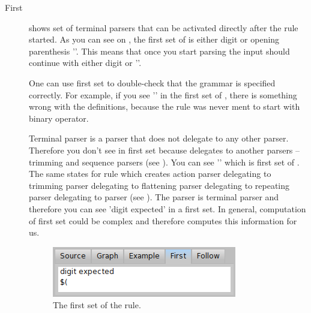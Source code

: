 \documentclass[a4paper,10pt,twoside]{book}
\begin{document}
\begin{description}
\item[First] shows set of terminal parsers that can be activated directly 
    after the rule started.
  As you can see on , the first set of  is 
    either digit or opening parenthesis '\ct{(}'. 
  This means that once you start parsing  the input should continue 
    with either digit or '\ct{(}'.
  
  One can use first set to double-check that the grammar is specified correctly.
  For example, if you see '\ct{+}' in the first set of , there is 
    something wrong with the definitions, because the  rule was never 
    ment to start with binary operator.
  
  Terminal parser is a parser that does not delegate to any other parser.
  Therefore you don't see  in  first set because 
    delegates to another parsers -- trimming and sequence parsers 
    (see ).
  You can see '\ct{(}' which is first set of .
  The same states for  rule which creates action parser delegating to
    trimming parser delegating to flattening parser delegating to repeating parser 
    delegating to  parser
    (see ).
  The  parser is terminal parser and therefore you can see 
    'digit expected' in a first set.
  In general, computation of first set could be complex and therefore
     computes this information for us.

  \begin{figure}[ht]
    \begin{center}
      \includegraphics[width=.4\linewidth]{PPBrowserFirst}
      \caption{The first set of the 
        rule. \label{fig:pp/browserFirst}}
    \end{center}
  \end{figure}

  \begin{script}{ rule in  \label{scr:pp/expressionGrammarPrimAndParens}}
ExpressionGrammar>>prim
    ^ parens / number

ExpressionGrammar>>parens
    ^ $( asParser trim, term, $} asParser trim

ExpressionGrammar>>number
    ^ #digit asParser plus flatten trim ==> [:str | str asNumber ]
\end{script}



\end{description}
\end{document}
